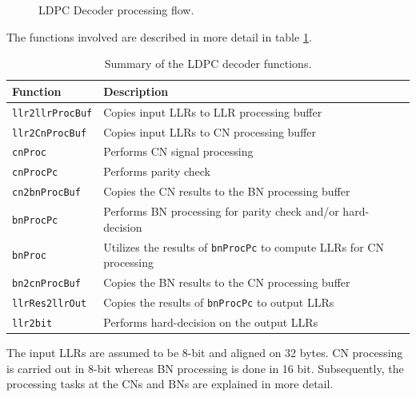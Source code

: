 \documentclass{article}
\begin{document}
\begin{figure}[ht]

  \caption{LDPC Decoder processing flow.}
\end{figure}

The functions involved are described in more detail in table \ref{tab:sum_func}.

\begin{table}[ht]
  \centering
  \begin{tabular}{ll}
    \toprule
    \textbf{Function} & \textbf{Description} \\
    \midrule
    \texttt{llr2llrProcBuf} & Copies input LLRs to LLR processing buffer \\
    \texttt{llr2CnProcBuf}  & Copies input LLRs to CN  processing buffer \\
    \texttt{cnProc}         & Performs CN signal processing \\
    \texttt{cnProcPc}       & Performs parity check \\
    \texttt{cn2bnProcBuf}   & Copies the CN results to the BN processing buffer \\
    \texttt{bnProcPc}       & Performs BN processing for parity check and/or hard-decision \\
    \texttt{bnProc}         & Utilizes the results of \texttt{bnProcPc} to compute LLRs for CN processing \\
    \texttt{bn2cnProcBuf}   & Copies the BN results to the CN processing buffer \\
    \texttt{llrRes2llrOut}  & Copies the results of \texttt{bnProcPc} to output LLRs \\
    \texttt{llr2bit}        & Performs hard-decision on the output LLRs \\
    \bottomrule
  \end{tabular}
  \caption{Summary of the LDPC decoder functions.}
  \label{tab:sum_func}
\end{table}

The input LLRs are assumed to be 8-bit and aligned on 32 bytes. CN processing is carried out in 8-bit whereas BN processing is done in 16 bit. Subsequently, the processing tasks at the CNs and BNs are explained in more detail.
\end{document}
